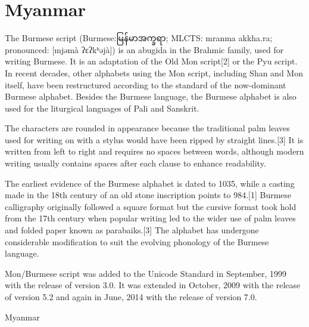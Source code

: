 \section{Myanmar}

\newfontfamily{}

The Burmese script (Burmese:{\myanmar မြန်မာအက္ခရာ}; MLCTS: mranma akkha.ra; pronounced: [mjəmà ʔɛʔkʰəjà]) is an abugida in the Brahmic family, used for writing Burmese. It is an adaptation of the Old Mon script[2] or the Pyu script. In recent decades, other alphabets using the Mon script, including Shan and Mon itself, have been restructured according to the standard of the now-dominant Burmese alphabet. Besides the Burmese language, the Burmese alphabet is also used for the liturgical languages of Pali and Sanskrit.

The characters are rounded in appearance because the traditional palm leaves used for writing on with a stylus would have been ripped by straight lines.[3] It is written from left to right and requires no spaces between words, although modern writing usually contains spaces after each clause to enhance readability.

The earliest evidence of the Burmese alphabet is dated to 1035, while a casting made in the 18th century of an old stone inscription points to 984.[1] Burmese calligraphy originally followed a square format but the cursive format took hold from the 17th century when popular writing led to the wider use of palm leaves and folded paper known as parabaiks.[3] The alphabet has undergone considerable modification to suit the evolving phonology of the Burmese language.

Mon/Burmese script was added to the Unicode Standard in September, 1999 with the release of version 3.0. It was extended in October, 2009 with the release of version 5.2 and again in June, 2014 with the release of version 7.0.

\begin{scriptexample}[]{Myanmar}
\end{scriptexample}






